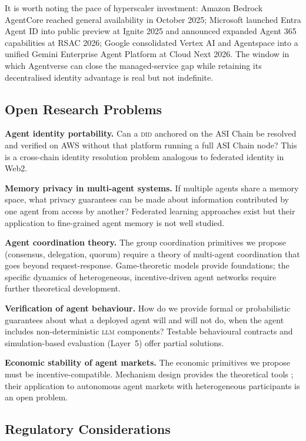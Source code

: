 \documentclass[twoside,11pt]{article}
\begin{document}
It is worth noting the pace of hyperscaler investment: Amazon Bedrock AgentCore
reached general availability in October 2025; Microsoft launched Entra Agent
ID into public preview at Ignite 2025 and announced expanded Agent 365
capabilities at RSAC 2026; Google consolidated Vertex AI and Agentspace into a
unified Gemini Enterprise Agent Platform at Cloud Next 2026.  The window in
which Agentverse can close the managed-service gap while retaining its
decentralised identity advantage is real but not indefinite.

\subsection{Open Research Problems}
\label{subsec:open-problems}

\textbf{Agent identity portability.} Can a \textsc{did} anchored on the ASI
Chain be resolved and verified on AWS without that platform running a full ASI
Chain node?  This is a cross-chain identity resolution problem analogous to
federated identity in Web2.

\textbf{Memory privacy in multi-agent systems.} If multiple agents share a
memory space, what privacy guarantees can be made about information contributed
by one agent from access by another?  Federated learning approaches exist but
their application to fine-grained agent memory is not well studied.

\textbf{Agent coordination theory.} The group coordination primitives we
propose (consensus, delegation, quorum) require a theory of multi-agent
coordination that goes beyond request-response.  Game-theoretic models provide
foundations; the specific dynamics of heterogeneous, incentive-driven agent
networks require further theoretical development.

\textbf{Verification of agent behaviour.} How do we provide formal or
probabilistic guarantees about what a deployed agent will and will not do, when
the agent includes non-deterministic \textsc{llm} components?  Testable
behavioural contracts and simulation-based evaluation (Layer~5) offer partial
solutions.

\textbf{Economic stability of agent markets.} The economic primitives we
propose must be incentive-compatible.  Mechanism design provides the
theoretical tools \citep{myerson2007mechanism}; their application to autonomous
agent markets with heterogeneous participants is an open problem.

\subsection{Regulatory Considerations}
\label{subsec:regulatory}
\end{document}

